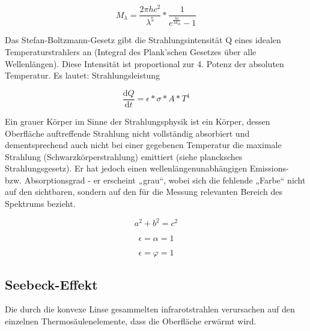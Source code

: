 \begin{equation}
\label{eq5}
M_{\lambda } = \frac{2\pi h c^2 }{\lambda^5}*\frac{1}{e^\frac{hc}{\lambda k_{B}}-1}
\end{equation}

Das Stefan-Boltzmann-Gesetz gibt die Strahlungsintensität Q eines idealen Temperaturstrahlers an (Integral des Plank'schen Gesetzes über alle Wellenlängen). Diese Intensität ist proportional zur 4. Potenz der absoluten Temperatur. Es lautet:
Strahlungsleistung

\begin{equation}
\label{eq1}
\frac{\mathrm{d} Q}{\mathrm{d} t} = \epsilon *\sigma * A * T^4
\end{equation}






Ein grauer Körper im Sinne der Strahlungsphysik ist ein Körper, dessen Oberfläche auftreffende Strahlung nicht vollständig absorbiert und dementsprechend auch nicht bei einer gegebenen Temperatur die maximale Strahlung (Schwarzkörperstrahlung) emittiert (siehe plancksches Strahlungsgesetz). Er hat jedoch einen wellenlängenunabhängigen Emissions- bzw. Absorptionsgrad - er erscheint „grau“, wobei sich die fehlende „Farbe“ nicht auf den sichtbaren, sondern auf den für die Messung relevanten Bereich des Spektrums bezieht.

\begin{equation}
\label{eq2}
a^2+b^2=c^2
\end{equation}


\begin{equation}
\label{eq4}
\epsilon = \alpha  = 1
\end{equation}

\begin{equation}
\label{eq4}
\epsilon = \varphi  = 1
\end{equation}



\subsection{Seebeck-Effekt}
\label{seebeck}

Die durch die konvexe Linse gesammelten infrarotstrahlen verursachen auf den einzelnen Thermosäulenelemente, dass die Oberfläche erwärmt wird. 


